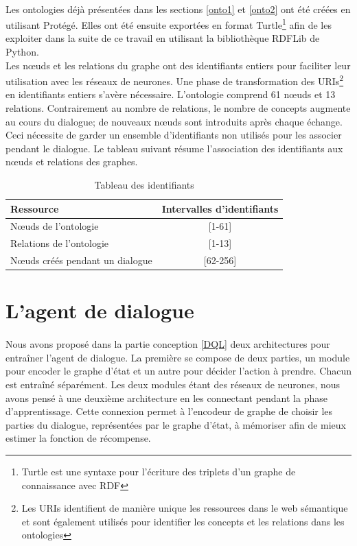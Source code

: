 \paragraph{}Les ontologies déjà présentées dans les sections \ref{onto1} et \ref{onto2} ont été créées en utilisant Protégé. Elles ont été ensuite exportées en format Turtle\footnote{Turtle est une syntaxe pour l'écriture des triplets d'un graphe de connaissance avec RDF} afin de les exploiter dans la suite de ce travail en utilisant la bibliothèque RDFLib de Python.\\[6pt]
Les n\oe{}uds et les relations du graphe ont des identifiants entiers pour faciliter leur utilisation avec les réseaux de neurones. Une phase de transformation des URIs\footnote{Les URIs identifient de manière unique les ressources dans le web sémantique et sont également utilisés pour identifier les concepts et les relations dans les ontologies} en identifiants entiers s'avère nécessaire. L'ontologie comprend 61 n\oe{}uds et 13 relations. Contrairement au nombre de relations, le nombre de concepts augmente au cours du dialogue; de nouveaux n\oe{}uds sont introduits après chaque échange. Ceci nécessite de garder un ensemble d'identifiants non utilisés pour les associer pendant le dialogue. Le tableau suivant résume l'association des identifiants aux n\oe{}uds et relations des graphes.
\begin{table}[H]
	\begin{center}
		
		\begin{tabular}{|l|c|}
			\hline
			\textbf{Ressource} & \textbf{Intervalles d'identifiants}\\
			\hline
			N\oe{}uds de l'ontologie & [1-61]\\
			\hline
			Relations de l'ontologie & [1-13]\\
			\hline
			N\oe{}uds créés pendant un dialogue & [62-256]\\
			\hline
		\end{tabular}
		\caption{Tableau des identifiants}\label{table_ids}
	\end{center}
\end{table}
\section{L'agent de dialogue}\label{DMReal}
\paragraph{}Nous avons proposé dans la partie conception \ref{DQL} deux architectures pour entraîner l'agent de dialogue. La première se compose de deux parties, un module pour encoder le graphe d'état et un autre pour décider l'action à prendre. Chacun est entraîné séparément. Les deux modules étant des réseaux de neurones, nous avons pensé à une deuxième architecture en les connectant pendant la phase d'apprentissage. Cette connexion permet à l'encodeur de graphe de choisir les parties du dialogue, représentées par le graphe d'état, à mémoriser afin de mieux estimer la fonction de récompense.
